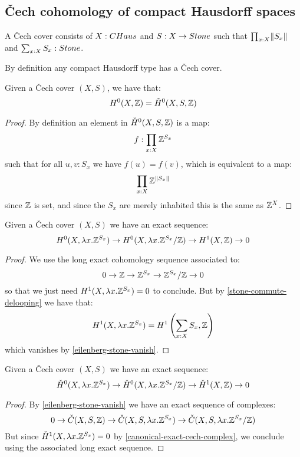 \subsection{\v{C}ech cohomology of compact Hausdorff spaces}

\begin{definition}
A \v{C}ech cover consists of $X:\CHaus$ and $S:X\to\Stone$ such that $\prod_{x:X}\lVert S_x \rVert$ and $\sum_{x:X}S_x:\Stone$.
\end{definition}

By definition any compact Hausdorff type has a \v{C}ech cover.

\begin{lemma}\label{cech-eilenberg-0-agree}
Given a \v{C}ech cover $(X,S)$, we have that:
\[H^0(X,\mathbb{Z}) = \check{H}^0(X,S,\mathbb{Z})\]
\end{lemma}

\begin{proof}
By definition an element in $\check{H}^0(X,S,\mathbb{Z})$ is a map:
\[f:\prod_{x:X}\mathbb{Z}^{S_x}\]
such that for all $u,v:S_x$ we have $f(u)=f(v)$, which is equivalent to a map:
\[\prod_{x:X}\mathbb{Z}^{\lVert S_x \rVert}\]
since $\mathbb{Z}$ is set, and since the $S_x$ are merely inhabited this is the same as $\mathbb{Z}^X$.
\end{proof}

\begin{lemma}\label{eilenberg-exact}
Given a \v{C}ech cover $(X,S)$ we have an exact sequence:
\[H^0(X,\lambda x.\mathbb{Z}^{S_x}) \to H^0(X,\lambda x.\mathbb{Z}^{S_x}/\mathbb{Z}) \to H^1(X,\mathbb{Z})\to 0\]
\end{lemma}

\begin{proof}
We use the long exact cohomology sequence associated to:
\[0 \to \mathbb{Z} \to \mathbb{Z}^{S_x} \to \mathbb{Z}^{S_x}/\mathbb{Z}\to 0\]
so that we just need $H^1(X,\lambda x.\mathbb{Z}^{S_x}) = 0$ to conclude. But by \cref{stone-commute-delooping} we have that:
\[H^1(X,\lambda x.\mathbb{Z}^{S_x}) = H^1\left(\sum_{x:X}S_x,\mathbb{Z}\right)\]
which vanishes by \cref{eilenberg-stone-vanish}.
\end{proof}

\begin{lemma}\label{cech-exact}
Given a \v{C}ech cover $(X,S)$ we have an exact sequence:
\[\check{H}^0(X,\lambda x.\mathbb{Z}^{S_x}) \to \check{H}^0(X,\lambda x.\mathbb{Z}^{S_x}/\mathbb{Z}) \to \check{H}^1(X,\mathbb{Z})\to 0\]
\end{lemma}

\begin{proof}
By \cref{eilenberg-stone-vanish} we have an exact sequence of complexes:
\[0 \to \check{C}(X,S,\mathbb{Z}) \to \check{C}(X,S,\lambda x.\mathbb{Z}^{S_x}) \to \check{C}(X,S,\lambda x.\mathbb{Z}^{S_x}/\mathbb{Z})\]
But since $\check{H}^1(X,\lambda x.\mathbb{Z}^{S_x}) = 0$ by \cref{canonical-exact-cech-complex}, we conclude using the associated long exact sequence.
\end{proof}

